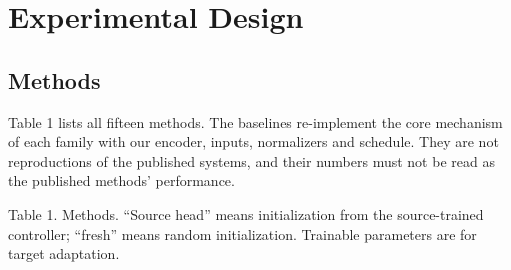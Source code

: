 \documentclass[11pt,a4paper]{article}
\begin{document}
\section{Experimental Design}

\subsection{Methods}

Table 1 lists all fifteen methods. The baselines re-implement the core mechanism of each family with our encoder, inputs, normalizers and schedule. They are not reproductions of the published systems, and their numbers must not be read as the published methods' performance.


Table 1. Methods. ``Source head'' means initialization from the source-trained controller; ``fresh'' means random initialization. Trainable parameters are for target adaptation.
\end{document}
